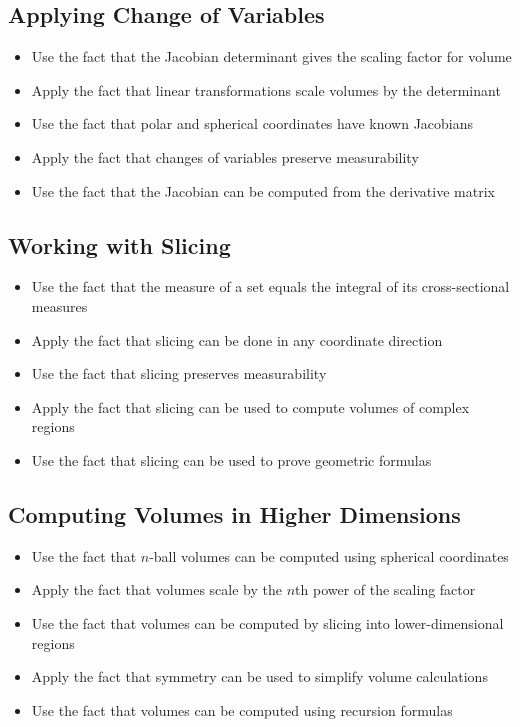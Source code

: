 \subsection*{Applying Change of Variables}
\begin{itemize}
\item Use the fact that the Jacobian determinant gives the scaling factor for volume
\item Apply the fact that linear transformations scale volumes by the determinant
\item Use the fact that polar and spherical coordinates have known Jacobians
\item Apply the fact that changes of variables preserve measurability
\item Use the fact that the Jacobian can be computed from the derivative matrix
\end{itemize}

\subsection*{Working with Slicing}
\begin{itemize}
\item Use the fact that the measure of a set equals the integral of its cross-sectional measures
\item Apply the fact that slicing can be done in any coordinate direction
\item Use the fact that slicing preserves measurability
\item Apply the fact that slicing can be used to compute volumes of complex regions
\item Use the fact that slicing can be used to prove geometric formulas
\end{itemize}

\subsection*{Computing Volumes in Higher Dimensions}
\begin{itemize}
\item Use the fact that $n$-ball volumes can be computed using spherical coordinates
\item Apply the fact that volumes scale by the $n$th power of the scaling factor
\item Use the fact that volumes can be computed by slicing into lower-dimensional regions
\item Apply the fact that symmetry can be used to simplify volume calculations
\item Use the fact that volumes can be computed using recursion formulas
\end{itemize}

